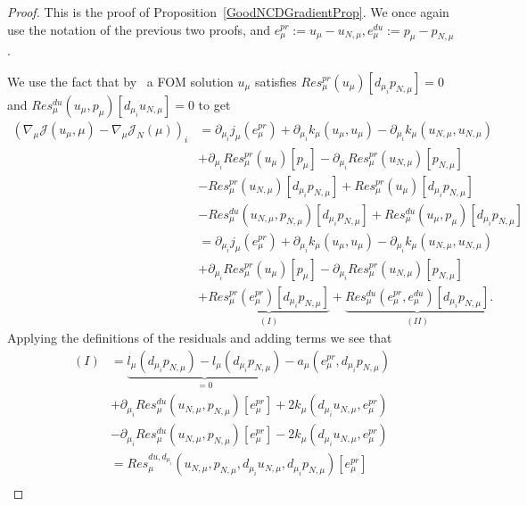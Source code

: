 \begin{proof}
    This is the proof of Proposition~\ref{GoodNCDGradientProp}.
    We once again use the notation of the previous two proofs, and $e_\mu^{pr} := u_\mu - u_{N, \mu}, e_\mu^{du} := p_\mu - p_{N, \mu}$.

    We use the fact that by~\cite[Equations 3.1 and 3.2]{Keil2021} a FOM solution $u_\mu$ satisfies $Res_\mu^{pr}(u_\mu)[d_{\mu_i} p_{N, \mu}] = 0$ and $Res_\mu^{du}(u_\mu, p_\mu)[d_{\mu_i} u_{N, \mu}] = 0$ to get
    \begin{align}
        {\left( \nabla_\mu \mathcal{J}(u_\mu, \mu) - \nabla_\mu \mathcal{J}_N(\mu) \right)}_i &= \partial_{\mu_i} j_\mu(e_\mu^{pr}) + \partial_{\mu_i} k_\mu(u_\mu, u_\mu) - \partial_{\mu_i} k_\mu(u_{N, \mu}, u_{N, \mu}) \label{PrfEq5}\\
        &+ \partial_{\mu_i} Res_\mu^{pr}(u_\mu)[p_\mu] - \partial_{\mu_i} Res_\mu^{pr}(u_{N, \mu})[p_{N, \mu}] \nonumber\\
        &- Res_\mu^{pr}(u_{N, \mu})[d_{\mu_i} p_{N, \mu}] + Res_\mu^{pr}(u_\mu)[d_{\mu_i} p_{N, \mu}] \nonumber\\
        &- Res_\mu^{du}(u_{N, \mu}, p_{N, \mu})[d_{\mu_i} p_{N, \mu}] + Res_\mu^{du}(u_\mu, p_\mu)[d_{\mu_i} p_{N, \mu}] \nonumber\\
        &= \partial_{\mu_i} j_\mu(e_\mu^{pr}) + \partial_{\mu_i} k_\mu(u_\mu, u_\mu) - \partial_{\mu_i} k_\mu(u_{N, \mu}, u_{N, \mu}) \nonumber\\
        &+ \partial_{\mu_i} Res_\mu^{pr}(u_\mu)[p_\mu] - \partial_{\mu_i} Res_\mu^{pr}(u_{N, \mu})[p_{N, \mu}] \nonumber\\
        &+ \underbrace{Res_\mu^{pr}(e_\mu^{pr})[d_{\mu_i} p_{N, \mu}]}_{(I)} + \underbrace{Res_\mu^{du}(e_\mu^{pr}, e_\mu^{du})[d_{\mu_i} p_{N, \mu}]}_{(II)}. \nonumber
    \end{align}
    Applying the definitions of the residuals and adding terms we see that
    \begin{align}
        (I) &= \underbrace{l_\mu(d_{\mu_i} p_{N, \mu}) - l_\mu(d_{\mu_i} p_{N, \mu})}_{= 0} - a_\mu(e_\mu^{pr}, d_{\mu_i} p_{N, \mu}) \label{PrfEq6}\\
        &+ \partial_{\mu_i} Res_\mu^{du}(u_{N, \mu}, p_{N, \mu})[e_\mu^{pr}] + 2 k_\mu(d_{\mu_i} u_{N, \mu}, e_\mu^{pr}) \nonumber\\
        &- \partial_{\mu_i} Res_\mu^{du}(u_{N, \mu}, p_{N, \mu})[e_\mu^{pr}] - 2 k_\mu(d_{\mu_i} u_{N, \mu}, e_\mu^{pr}) \nonumber\\
        &= Res_\mu^{du, d_{\mu_i}}(u_{N, \mu}, p_{N, \mu}, d_{\mu_i} u_{N, \mu}, d_{\mu_i} p_{N, \mu})[e_\mu^{pr}] \nonumber\\

\end{align}
\end{proof}
